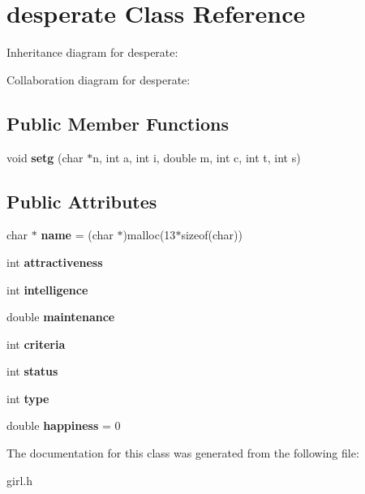 \hypertarget{classdesperate}{}\section{desperate Class Reference}
\label{classdesperate}


Inheritance diagram for desperate\+:


Collaboration diagram for desperate\+:
\subsection*{Public Member Functions}
\begin{DoxyCompactItemize}
\item 
void {\bfseries setg} (char $\ast$n, int a, int i, double m, int c, int t, int s)\hypertarget{classdesperate_a82b07a3427bf49c8fd867179e309f9a8}{}\label{classdesperate_a82b07a3427bf49c8fd867179e309f9a8}

\end{DoxyCompactItemize}
\subsection*{Public Attributes}
\begin{DoxyCompactItemize}
\item 
char $\ast$ {\bfseries name} = (char $\ast$)malloc(13$\ast$sizeof(char))\hypertarget{classdesperate_ae3e53b8cfc4705acc38bb613fa3089a4}{}\label{classdesperate_ae3e53b8cfc4705acc38bb613fa3089a4}

\item 
int {\bfseries attractiveness}\hypertarget{classdesperate_aea8cad2b9eb62a556f4a23100d455dc1}{}\label{classdesperate_aea8cad2b9eb62a556f4a23100d455dc1}

\item 
int {\bfseries intelligence}\hypertarget{classdesperate_af220371ffbba7825533c33dfb0f52aa1}{}\label{classdesperate_af220371ffbba7825533c33dfb0f52aa1}

\item 
double {\bfseries maintenance}\hypertarget{classdesperate_a8e82b3c1a063737d1c083574ffff3eae}{}\label{classdesperate_a8e82b3c1a063737d1c083574ffff3eae}

\item 
int {\bfseries criteria}\hypertarget{classdesperate_a811e603008c918eb2f5439910600048e}{}\label{classdesperate_a811e603008c918eb2f5439910600048e}

\item 
int {\bfseries status}\hypertarget{classdesperate_a321c7bdce6010aad153cd16c9733365c}{}\label{classdesperate_a321c7bdce6010aad153cd16c9733365c}

\item 
int {\bfseries type}\hypertarget{classdesperate_a964e23a0b7e786623dcd669bb8804580}{}\label{classdesperate_a964e23a0b7e786623dcd669bb8804580}

\item 
double {\bfseries happiness} = 0\hypertarget{classdesperate_a299cf2240876d469654edf3ea9507e82}{}\label{classdesperate_a299cf2240876d469654edf3ea9507e82}

\end{DoxyCompactItemize}


The documentation for this class was generated from the following file\+:\begin{DoxyCompactItemize}
\item 
girl.\+h\end{DoxyCompactItemize}
